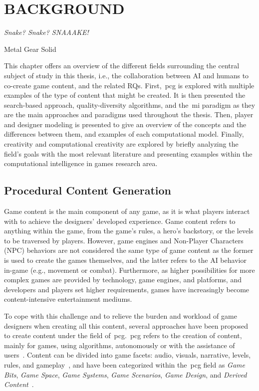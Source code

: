 \section{BACKGROUND} \normalfont \label{background}

\setlength{\epigraphwidth}{2in} 
\epigraph{\textit{Snake? Snake? SNAAAKE!}}{Metal Gear Solid}

\setlength{\parindent}{0.0em}

This chapter offers an overview of the different fields surrounding the central subject of study in this thesis, i.e., the collaboration between AI and humans to co-create game content, and the related RQs. First,~\acrlong{pcg} is explored with multiple examples of the type of content that might be created. It is then presented the search-based approach, quality-diversity algorithms, and the~\acrlong{mi} paradigm as they are the main approaches and paradigms used throughout the thesis. Then, player and designer modeling is presented to give an overview of the concepts and the differences between them, and examples of each computational model. Finally, creativity and computational creativity are explored by briefly analyzing the field's goals with the most relevant literature and presenting examples within the computational intelligence in games research area.

\subsection{Procedural Content Generation}

Game content is the main component of any game, as it is what players interact with to achieve the designers' developed experience. Game content refers to anything within the game, from the game's rules, a hero's backstory, or the levels to be traversed by players. However, game engines and Non-Player Characters (NPC) behaviors are not considered the same type of game content as the former is used to create the games themselves, and the latter refers to the AI behavior in-game (e.g., movement or combat). Furthermore, as higher possibilities for more complex games are provided by technology, game engines, and platforms, and developers and players set higher requirements, games have increasingly become content-intensive entertainment mediums. 

To cope with this challenge and to relieve the burden and workload of game designers when creating all this content, several approaches have been proposed to create content under the field of~\acrlong{pcg}.~\acrshort{pcg} refers to the creation of content, mainly for games, using algorithms, autonomously or with the assistance of users~\cite{yannakakis_artificial_2018}. Content can be divided into game facets: audio, visuals, narrative, levels, rules, and gameplay~\cite{liapis_orchestrating_2019}, and have been categorized within the~\acrshort{pcg} field as \textit{Game Bits}, \textit{Game Space}, \textit{Game Systems}, \textit{Game Scenarios}, \textit{Game Design}, and \textit{Derived Content}~\cite{hendrikx_procedural_2013}.

